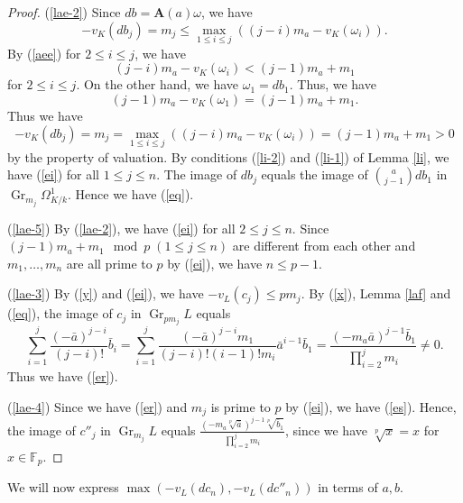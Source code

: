 \documentclass[10pt,a4paper]{amsart}
\numberwithin{equation}{section}
\newcommand{\Gr}{\operatorname{Gr}}
\theoremstyle{plain}
\theoremstyle{definition}
\begin{document}
\begin{proof}
  (\ref{lae-2}) Since $db=\mathbf{A}(a)\omega$, we have 
  \begin{equation}
  -v_K(db_j)=m_j\leq\max_{1\leq i\leq j}((j-i)m_a-v_K(\omega_i)).
  \end{equation}
  By (\ref{aee}) for $2\leq i\leq j$, we have
  \begin{equation}
  (j-i)m_a-v_K(\omega_i)<(j-1)m_a+m_1
  \end{equation}
  for $2\leq i\leq j$. On the other hand, we have $\omega_1=db_1$. Thus, we have
  \begin{equation}
  (j-1)m_a-v_K(\omega_1)=(j-1)m_a+m_1.
  \end{equation}
  Thus we have
  \begin{equation}
    -v_K(db_j)=m_j=\max_{1\leq i\leq j}((j-i)m_a-v_K(\omega_i))=(j-1)m_a+m_1>0
  \end{equation}
  by the property of valuation. By conditions (\ref{li-2}) and (\ref{li-1}) of Lemma \ref{li}, we have (\ref{ei}) for all $1\leq j\leq n$. The image of $db_j$ equals the image of $\displaystyle{\binom{a}{j-1}db_1}$ in $\Gr_{m_j}\Omega_{K/k}^1$. Hence we have (\ref{eq}).




  (\ref{lae-5}) By (\ref{lae-2}), we have (\ref{ei}) for all $2\leq j\leq n$. Since $(j-1)m_a+m_1\mod p\;(1\leq j\leq n)$ are different from each other and $m_1,\ldots,m_n$ are all prime to $p$ by (\ref{ei}), we have $n\leq p-1$.
  
  (\ref{lae-3}) By (\ref{y}) and (\ref{ei}), we have $-v_L(c_j)\leq pm_j$.  By (\ref{x}), Lemma \ref{laf} and (\ref{eq}), the image of $c_j$ in $\Gr_{pm_j}L$ equals
  \begin{equation}
  \sum_{i=1}^j\frac{(-\bar{a})^{j-i}}{(j-i)!}\bar{b}_i=\sum_{i=1}^j\frac{(-\bar{a})^{j-i}m_1}{(j-i)!(i-1)!m_i}\bar{a}^{i-1}\bar{b}_1
  =\frac{(-m_a\bar{a})^{j-1}\bar{b}_1}{\prod_{i=2}^jm_i}\neq 0.
  \end{equation}
  Thus we have (\ref{er}).

  (\ref{lae-4}) Since we have (\ref{er}) and $m_j$ is prime to $p$ by (\ref{ei}), we have (\ref{es}). Hence, the image of $c''_j$ in $\Gr_{m_j}L$ equals $\displaystyle{\frac{\left(-m_a\sqrt[p]{\bar{a}}\right)^{j-1}\sqrt[p]{\bar{b}_1}}{\prod_{i=2}^jm_i}}$, since we have $\sqrt[p]{x}=x$ for $x\in\mathbb{F}_p$.
\end{proof}

We will now express $\max(-v_L(dc_n),-v_L(dc''_n))$ in terms of $a,b$.
\end{document}
